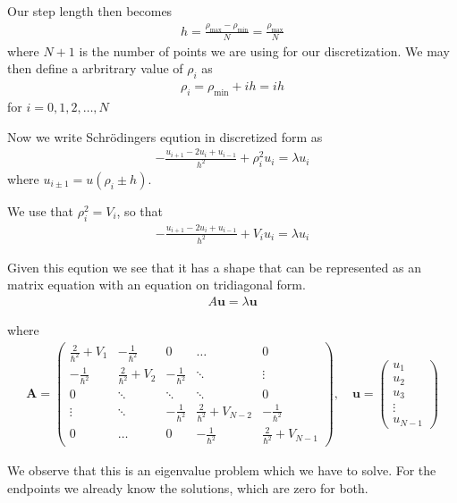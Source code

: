 \documentclass[11pt, a4paper]{article}
\begin{document}
Our step length then becomes 
\begin{gather}
h = \frac{\rho_\text{max}-\rho_\text{min}}{N} = \frac{\rho_\text{max}}{N}
\end{gather}
where $N+1$ is the number of points we are using for our discretization. 
We may then define a arbritrary value of $\rho_i$ as 
\begin{gather}
\rho_i = \rho_\text{min} + ih = ih
\end{gather}
for $i=0,1,2,\dots,N$

Now we write Schr\"odingers eqution in discretized form as
\begin{gather}
-\frac{u_{i+1} -2u_i +u_{i-1}}{h^2}+\rho_i^2u_i=\lambda u_i
\end{gather}
where $u_{i\pm1} = u(\rho_i \pm h)$.

We use that $\rho_i^2=V_i$, so that 
\begin{gather}
-\frac{u_{i+1} -2u_i +u_{i-1}}{h^2}+V_iu_i=\lambda u_i
\end{gather}

Given this eqution we see that it has a shape that can be represented as an matrix equation with an equation on tridiagonal form.
\begin{gather}
A\mathbf{u}=\lambda\mathbf{u}
\label{eigequ}
\end{gather}

where
\begin{gather}
\mathbf{A} = 
\begin{pmatrix}
\frac{2}{\hbar^2} + V_1& -\frac{1}{\hbar^2} & 0 & \dots & 0\\
-\frac{1}{\hbar^2} & \frac{2}{\hbar^2} + V_2& -\frac{1}{\hbar^2} & \ddots & \vdots \\
0 & \ddots & \ddots & \ddots & 0\\
\vdots & \ddots & -\frac{1}{\hbar^2} & \frac{2}{\hbar^2} + V_{N-2} & -\frac{1}{\hbar^2}\\
0 & \dots & 0 & -\frac{1}{\hbar^2} &\frac{2}{\hbar^2} + V_{N-1}
\end{pmatrix},
\quad
\mathbf{u} =
\begin{pmatrix}
u_1\\
u_2\\
u_3\\
\vdots\\
u_{N-1}
\end{pmatrix}
\end{gather}

We observe that this is an eigenvalue problem which we have to solve. For the endpoints we already know the solutions, which are zero for both. 
\end{document}
